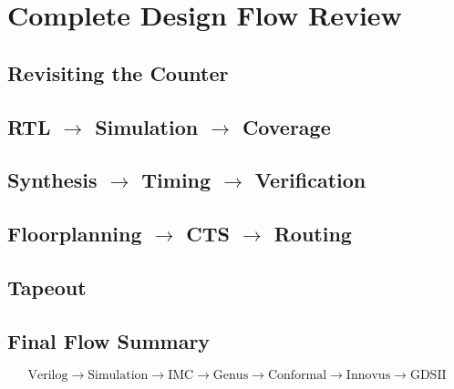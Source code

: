 \chapter{Complete Design Flow Review}

\section{Revisiting the Counter}

\section{\texorpdfstring{RTL $\rightarrow$ Simulation $\rightarrow$ Coverage}{RTL to Simulation to Coverage}}

\section{\texorpdfstring{Synthesis $\rightarrow$ Timing $\rightarrow$ Verification}{Synthesis to Timing to Verification}}

\section{\texorpdfstring{Floorplanning $\rightarrow$ CTS $\rightarrow$ Routing}{Floorplanning to CTS to Routing}}

\section{Tapeout}

\section{Final Flow Summary}

\[
	\text{Verilog} \rightarrow \text{Simulation} \rightarrow \text{IMC} \rightarrow \text{Genus} \rightarrow \text{Conformal} \rightarrow \text{Innovus} \rightarrow \text{GDSII}
\]
